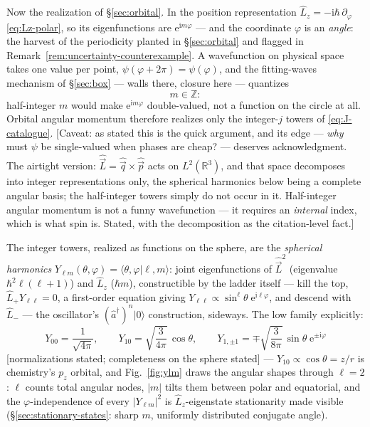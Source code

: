 \documentclass[11pt]{article}
\theoremstyle{plain}
\theoremstyle{definition}
\theoremstyle{remark}
\newcommand{\ee}{\mathrm{e}}
\newcommand{\ii}{\mathrm{i}}
\newcommand{\R}{\mathbb{R}}
\newcommand{\op}[1]{\hat{#1}}
\newcommand{\ket}[1]{\lvert #1 \rangle}
\newcommand{\braket}[2]{\langle #1 | #2 \rangle}
\begin{document}
Now the realization of \S\ref{sec:orbital}. In the position
representation $\op L_z = -\ii\hbar\,\partial_\varphi$
\eqref{eq:Lz-polar}, so its eigenfunctions are
$\ee^{\ii m\varphi}$ --- and the coordinate $\varphi$ is an
\emph{angle}: the harvest of the periodicity planted in
\S\ref{sec:orbital} and flagged in
Remark~\ref{rem:uncertainty-counterexample}. A wavefunction on
physical space takes one value per point,
$\psi(\varphi + 2\pi) = \psi(\varphi)$, and the fitting-waves
mechanism of \S\ref{sec:box} --- walls there, closure here ---
quantizes
\begin{equation}
  m \in \mathbb Z :
\end{equation}
half-integer $m$ would make $\ee^{\ii m\varphi}$ double-valued, not
a function on the circle at all. Orbital angular momentum therefore
realizes only the integer-$j$ towers of \eqref{eq:J-catalogue}.
[Caveat: as stated this is the quick argument, and its edge
--- \emph{why} must $\psi$ be single-valued when phases are cheap?
--- deserves acknowledgment. The airtight version: $\op{\vec L} =
\op{\vec q}\times\op{\vec p}$ acts on $L^2(\R^3)$, and that space
decomposes into integer representations only, the spherical
harmonics below being a complete angular basis; the half-integer
towers simply do not occur in it. Half-integer angular momentum is
not a funny wavefunction --- it requires an \emph{internal} index,
which is what spin is. Stated, with the decomposition as the
citation-level fact.]

The integer towers, realized as functions on the sphere, are the
\emph{spherical harmonics} $Y_{\ell m}(\theta, \varphi) =
\braket{\theta, \varphi}{\ell, m}$: joint eigenfunctions of
$\op{\vec L}^2$ (eigenvalue $\hbar^2\ell(\ell+1)$) and $\op L_z$
($\hbar m$), constructible by the ladder itself --- kill the top,
$\op L_+ Y_{\ell\ell} = 0$, a first-order equation giving
$Y_{\ell\ell} \propto \sin^\ell\!\theta\;\ee^{\ii\ell\varphi}$, and
descend with $\op L_-$ --- the oscillator's
$(\op a^\dagger)^n\ket0$ construction, sideways. The low family
explicitly:
\begin{equation}
  Y_{00} = \frac{1}{\sqrt{4\pi}},
  \qquad
  Y_{10} = \sqrt{\frac{3}{4\pi}}\,\cos\theta,
  \qquad
  Y_{1,\pm1} = \mp\sqrt{\frac{3}{8\pi}}\,
    \sin\theta\;\ee^{\pm\ii\varphi}
  \label{eq:Ylm-low}
\end{equation}
[normalizations stated; completeness on the sphere stated] ---
$Y_{10} \propto \cos\theta = z/r$ is chemistry's $p_z$ orbital, and
Fig.~\ref{fig:ylm} draws the angular shapes through $\ell = 2$:
$\ell$ counts total angular nodes, $|m|$ tilts them between polar
and equatorial, and the $\varphi$-independence of every $|Y_{\ell
m}|^2$ is $\op L_z$-eigenstate stationarity made visible
(\S\ref{sec:stationary-states}: sharp $m$, uniformly distributed
conjugate angle).
\end{document}
